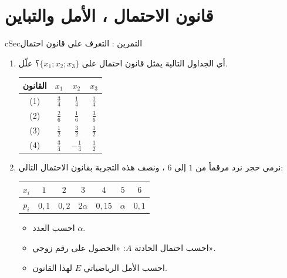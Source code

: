 \documentclass[12pt,a4paper]{article}
\newenvironment{BOX}[2]{\begin{otherlanguage}{english}\begin{arbox}{#1}{#2}}{\end{arbox}\end{otherlanguage}}
\newcounter{exo}
\newenvironment{tamrin}[1]{\stepcounter{exo}\begin{BOX}{cSec}{التمرين \theexo: #1}}{\end{BOX}}
\newcommand{\ar}[1]{\foreignlanguage{arabic}{#1}}
\newenvironment{sq}{\begin{itemize}[leftmargin=2.4em,itemsep=3pt]}{\end{itemize}}
\newcommand{\qa}{\item[(أ)]}\newcommand{\qb}{\item[(ب)]}\newcommand{\qc}{\item[(جـ)]}\newcommand{\qd}{\item[(د)]}\newcommand{\qe}{\item[(هـ)]}
\begin{document}
\section{قانون الاحتمال ، الأمل والتباين}
\begin{tamrin}{التعرف على قانون احتمال}
\begin{enumerate}
\item أي الجداول التالية يمثل قانون احتمال على $\{x_1;x_2;x_3\}$؟ علّل.
\begin{center}
\renewcommand{\arraystretch}{1.4}
\begin{tabular}{|C|c|c|c|}\hline
{}\ar{القانون} & $x_1$ & $x_2$ & $x_3$\\
\hline
(1) & $\frac34$ & $\frac14$ & $\frac14$\\
\hline
(2) & $\frac26$ & $\frac16$ & $\frac36$\\
\hline
(3) & $\frac12$ & $\frac32$ & $\frac12$\\
\hline
(4) & $\frac34$ & $-\frac14$ & $\frac12$\\
\hline
\end{tabular}
\end{center}
\item نرمي حجر نرد مرقماً من $1$ إلى $6$ ، ونصف هذه التجربة بقانون الاحتمال التالي:
\begin{center}
\renewcommand{\arraystretch}{1.4}
\begin{tabular}{|C|c|c|c|c|c|c|}\hline
{}$x_i$ & $1$ & $2$ & $3$ & $4$ & $5$ & $6$\\
\hline
$p_i$ & $0{,}1$ & $0{,}2$ & $2\alpha$ & $0{,}15$ & $\alpha$ & $0{,}1$\\
\hline
\end{tabular}
\end{center}
\begin{sq}
\qa احسب العدد $\alpha$.
\qb احسب احتمال الحادثة $A$: «الحصول على رقم زوجي».
\qc احسب الأمل الرياضياتي $E$ لهذا القانون.
\end{sq}
\end{enumerate}
\end{tamrin}
\end{document}
